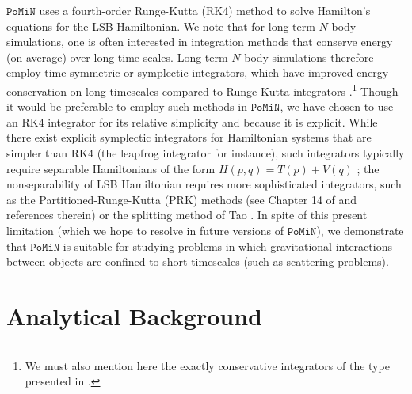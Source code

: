 \documentclass[aps,onecolumn,notitlepage,eqsecnum,nofootinbib,floatfix,superscriptaddress]{revtex4-1}
\newcommand{\codename}{\mathtt{PoMiN}}
\begin{document}
$\codename$ uses a fourth-order Runge-Kutta (RK4) method to solve Hamilton's equations for the LSB Hamiltonian. We note that for long term $N$-body simulations, one is often interested in integration methods that conserve energy (on average) over long time scales. Long term $N$-body simulations therefore employ time-symmetric or symplectic integrators, which have improved energy conservation on long timescales compared to Runge-Kutta integrators \cite{Hutetal1997,Hutetal1995}.\footnote{We must also mention here the exactly conservative integrators of the type presented in \cite{Shadwicketal1995}.} Though it would be preferable to employ such methods in $\codename$, we have chosen to use an RK4 integrator for its relative simplicity and because it is explicit. While there exist explicit symplectic integrators for Hamiltonian systems that are simpler than RK4 (the leapfrog integrator for instance), such integrators typically require separable Hamiltonians of the form $H(p,q)=T(p)+V(q)$ \cite{ForestRuth1990,*Yoshida1990}; the nonseparability of LSB Hamiltonian requires more sophisticated integrators, such as the Partitioned-Runge-Kutta (PRK) methods (see Chapter 14 of \cite{SanzSernaCalvo1994} and references therein) or the splitting method of Tao \cite{Tao2016}. In spite of this present limitation (which we hope to resolve in future versions of $\codename$), we demonstrate that $\codename$ is suitable for studying problems in which gravitational interactions between objects are confined to short timescales (such as scattering problems). 

\section{Analytical Background}
%
%
\end{document}
